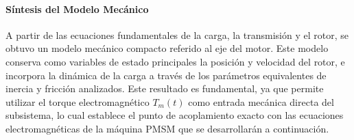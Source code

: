 \documentclass[10pt,a4paper]{article}
\begin{document}
\begin{table}[H]
    \centering
    \caption{Parámetros equivalentes referidos al eje motriz: Valores nominales y rangos de variación.}
    \label{tab:parametros_equivalentes_rangos}
\end{table}

\paragraph{Síntesis del Modelo Mecánico}
A partir de las ecuaciones fundamentales de la carga, la transmisión y el rotor, se obtuvo un modelo mecánico compacto referido al eje del motor. Este modelo conserva como variables de estado principales la posición y velocidad del rotor, e incorpora la dinámica de la carga a través de los parámetros equivalentes de inercia y fricción analizados. Este resultado es fundamental, ya que permite utilizar el torque electromagnético $T_m(t)$ como entrada mecánica directa del subsistema, lo cual establece el punto de acoplamiento exacto con las ecuaciones electromagnéticas de la máquina PMSM que se desarrollarán a continuación.


\end{document}

